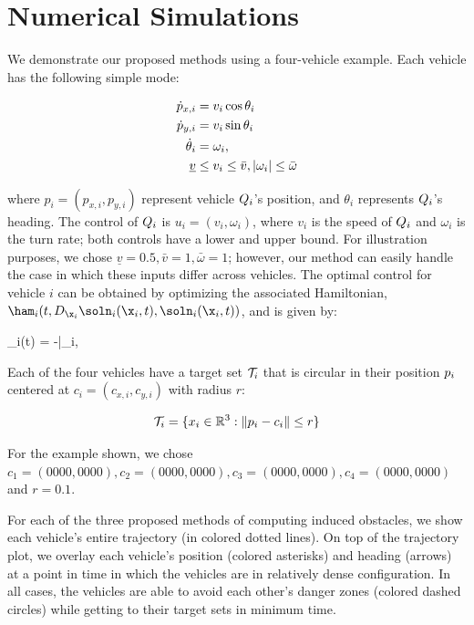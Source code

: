 \section{Numerical Simulations \label{sec:sim}}
We demonstrate our proposed methods using a four-vehicle example. Each vehicle has the following simple mode:

\begin{equation}
\label{eq:dyn_i}
\begin{aligned}
\dot{p}_{x,i} &= v_i \cos \theta_i \\
\dot{p}_{y,i} &= v_i \sin \theta_i \\
\dot{\theta}_i &= \omega_i, \\
\underline{v} &\le v_i \le \bar{v}, |\omega_i| \le \bar{\omega}
\end{aligned}
\end{equation}

\noindent where $p_i = (p_{x,i}, p_{y,i})$ represent vehicle $Q_i$'s position, and $\theta_i$ represents $Q_i$'s heading. The control of $Q_i$ is $u_i = (v_i, \omega_i)$, where $v_i$ is the speed of $Q_i$ and $\omega_i$ is the turn rate; both controls have a lower and upper bound. For illustration purposes, we chose $\underline{v} = 0.5, \bar{v} = 1, \bar\omega = 1$; however, our method can easily handle the case in which these inputs differ across vehicles. The optimal control for vehicle $i$ can be obtained by optimizing the associated Hamiltonian, $\ham_i(t, D_{\x_i}\soln_i(\x_i,t), \soln_i(\x_i,t))$, and is given by:

\bq
\omega_i(t) = -\bar{\omega}_i,
\eq

Each of the four vehicles have a target set $\mathcal{T}_i$ that is circular in their position $p_i$ centered at $c_i = (c_{x,i}, c_{y,i})$ with radius $r$:

\begin{equation}
\mathcal{T}_i = \{x_i \in \mathbb{R}^3: \|p_i - c_i\| \le r\}
\end{equation}

For the example shown, we chose $c_1 = (0000, 0000), c_2 = (0000, 0000), c_3 = (0000, 0000), c_4 = (0000, 0000)$ and $r = 0.1$. 

For each of the three proposed methods of computing induced obstacles, we show each vehicle's entire trajectory (in colored dotted lines). On top of the trajectory plot, we overlay each vehicle's position (colored asterisks) and heading (arrows) at a point in time in which the vehicles are in relatively dense configuration. In all cases, the vehicles are able to avoid each other's danger zones (colored dashed circles) while getting to their target sets in minimum time.

